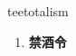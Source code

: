 
\begin{frame}
{\huge teetotalism}
\begin{center}
\begin{enumerate}\Large
  \item \textbf{禁酒令}
\end{enumerate}
\end{center}
\end{frame}
